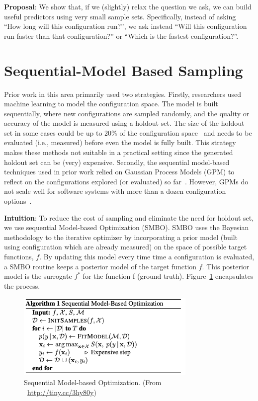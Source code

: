 \noindent\textbf{Proposal}: 
We show that, if we (slightly) relax the question
we ask, we can build useful predictors using very small sample sets.
Specifically, instead of asking ``How long will this configuration
run?'', we ask instead ``Will this configuration run faster than that
configuration?'' or ``Which is the fastest configuration?''.


\section{Sequential-Model Based Sampling}
Prior work in this area primarily used two strategies.
Firstly, researchers used machine learning to model the configuration
space. The model is built sequentially, where new
configurations are sampled randomly, and the quality or
accuracy of the model is measured using a holdout set. The
size of the holdout set in some cases could be up to 20\% of
the configuration space~\cite{nair2017using} and needs to be evaluated (i.e.,
measured) before even the model is fully built. This strategy
makes these methods not suitable in a practical setting since
the generated holdout set can be (very) expensive. Secondly,
the sequential model-based techniques used in prior work
relied on Gaussian Process Models (GPM) to reflect on the
configurations explored (or evaluated) so far~\cite{zuluaga2016varepsilon}. However,
GPMs do not scale well for software systems with more than
a dozen configuration options~\cite{wang2016bayesian}.



\noindent\textbf{Intuition}: 
To reduce the cost of sampling and eliminate the need for holdout set, we use sequential Model-based Optimization (SMBO). SMBO uses the Bayesian methodology to the iterative optimizer by incorporating a prior model (built using configuration which are already measured) on the space of possible target functions, $f$. By updating this model every time time a configuration is evaluated, a SMBO routine keeps a posterior model of the target function $f$. This posterior model is the surrogate $f^*$ for the function f (ground truth). Figure~\ref{fig:chap1_smbo} encapsulates the process.

\begin{figure}[!htbp]
    \centering
    \includegraphics[width=0.6\linewidth]{Chapter-Introduction/Figures/bayesian_opt.png}
    \caption[Algorithm for SMBO methods]{Sequential Model-based Optimization. (From ~\url{http://tiny.cc/3hy80y})}
    \label{fig:chap1_smbo}
\end{figure}

